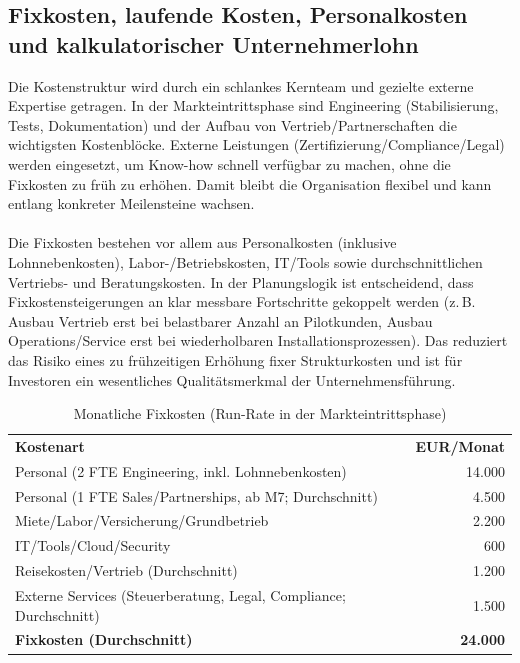 \documentclass[11pt,a4paper]{article}
\begin{document}
\subsection{Fixkosten, laufende Kosten, Personalkosten und kalkulatorischer Unternehmerlohn}
Die Kostenstruktur wird durch ein schlankes Kernteam und gezielte externe Expertise getragen. In der Markteintrittsphase sind Engineering (Stabilisierung, Tests, Dokumentation) und der Aufbau von Vertrieb/Partnerschaften die wichtigsten Kostenblöcke. Externe Leistungen (Zertifizierung/Compliance/Legal) werden eingesetzt, um Know-how schnell verfügbar zu machen, ohne die Fixkosten zu früh zu erhöhen. Damit bleibt die Organisation flexibel und kann entlang konkreter Meilensteine wachsen. \\
\\ Die Fixkosten bestehen vor allem aus Personalkosten (inklusive Lohnnebenkosten), Labor-/Betriebskosten, IT/Tools sowie durchschnittlichen Vertriebs- und Beratungskosten. In der Planungslogik ist entscheidend, dass Fixkostensteigerungen an klar messbare Fortschritte gekoppelt werden (z.\,B. Ausbau Vertrieb erst bei belastbarer Anzahl an Pilotkunden, Ausbau Operations/Service erst bei wiederholbaren Installationsprozessen). Das reduziert das Risiko eines zu frühzeitigen Erhöhung fixer Strukturkosten und ist für Investoren ein wesentliches Qualitätsmerkmal der Unternehmensführung.

\begin{table}[htbp]
\centering
\caption{Monatliche Fixkosten (Run-Rate in der Markteintrittsphase)}
\label{tab:fixkosten}
\renewcommand{\arraystretch}{1.1}
\begin{tabular}{p{} r}
\textbf{Kostenart} & \textbf{EUR/Monat}\\
Personal (2 FTE Engineering, inkl. Lohnnebenkosten) & 14.000\\
Personal (1 FTE Sales/Partnerships, ab M7; Durchschnitt) & 4.500\\
Miete/Labor/Versicherung/Grundbetrieb & 2.200\\
IT/Tools/Cloud/Security & 600\\
Reisekosten/Vertrieb (Durchschnitt) & 1.200\\
Externe Services (Steuerberatung, Legal, Compliance; Durchschnitt) & 1.500\\
\textbf{Fixkosten (Durchschnitt)} & \textbf{24.000}\\
\end{tabular}
\end{table}
\end{document}
